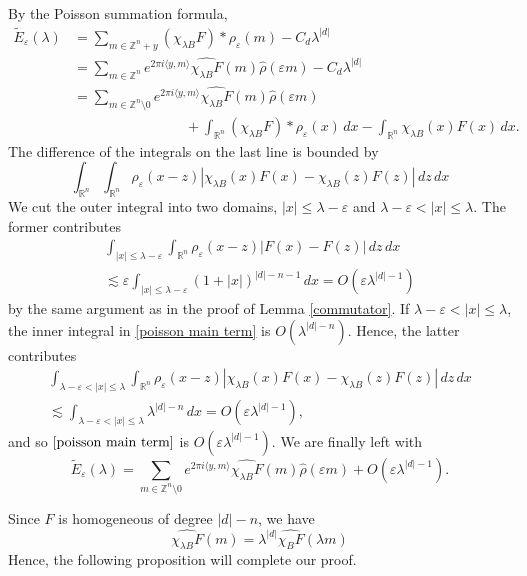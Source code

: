 \documentclass[10pt]{amsart}
\renewcommand{\epsilon}{\varepsilon}
\renewcommand{\epsilon}{\varepsilon}
\newcommand{\R}{{\mathbb R}}
\newcommand{\1}{\mathbb{1}}
\newcommand{\Z}{{\mathbb Z}}
\begin{document}
By the Poisson summation formula,
\begin{align*}
    \tilde E_\epsilon(\lambda) &= \sum_{m \in \Z^n + y} (\chi_{\lambda B} F)*\rho_\epsilon(m) - C_d \lambda^{|d|}\\
    &= \sum_{m \in \Z^n} e^{2\pi i\langle y,m \rangle} \widehat{\chi_{\lambda B} F}(m) \widehat \rho(\epsilon m) - C_d \lambda^{|d|}\\
    &= \sum_{m \in \Z^n \setminus 0} e^{2\pi i\langle y,m \rangle} \widehat{\chi_{\lambda B} F}(m) \widehat \rho(\epsilon m)\\
    &\hspace{8em} + \int_{\R^n} (\chi_{\lambda B} F)*\rho_\epsilon(x) \, dx - \int_{\R^n} \chi_{\lambda B}(x) F(x) \, dx.
\end{align*} 
The difference of the integrals on the last line is bounded by
\begin{equation}\label{poisson main term}
    \int_{\R^n} \int_{\R^n} \rho_\epsilon(x-z) |\chi_{\lambda B}(x) F(x) - \chi_{\lambda B}(z) F(z) | \, dz \, dx
\end{equation}
We cut the outer integral into two domains, $|x| \leq \lambda - \epsilon$ and $\lambda - \epsilon < |x| \leq \lambda$. The former contributes
\begin{multline*}
    \int_{|x| \leq \lambda - \epsilon} \int_{\R^n} \rho_\epsilon(x-z) |F(x) - F(z) | \, dz \, dx\\
    \lesssim \epsilon \int_{|x| \leq \lambda - \epsilon} (1 + |x|)^{|d|-n-1} \, dx = O(\epsilon \lambda^{|d|-1})
\end{multline*}
by the same argument as in the proof of Lemma \ref{commutator}. If $\lambda - \epsilon < |x| \leq \lambda$, the inner integral in \eqref{poisson main term} is $O(\lambda^{|d|-n})$. Hence, the latter contributes
\begin{multline*}
    \int_{\lambda - \epsilon < |x| \leq \lambda} \int_{\R^n} \rho_\epsilon(x-z) |\chi_{\lambda B}(x) F(x) - \chi_{\lambda B}(z) F(z) | \, dz \, dx\\
    \lesssim \int_{\lambda - \epsilon < |x| \leq \lambda} \lambda^{|d|-n} \, dx = O(\epsilon \lambda^{|d|-1}),
\end{multline*}
and so $\eqref{poisson main term}$ is $O(\epsilon \lambda^{|d|-1})$. We are finally left with
\[
    \tilde E_\epsilon(\lambda) = \sum_{m \in \Z^n \setminus 0} e^{2\pi i\langle y,m \rangle} \widehat{\chi_{\lambda B} F}(m) \widehat \rho(\epsilon m) + O(\epsilon \lambda^{|d|-1}).
\]

Since $F$ is homogeneous of degree $|d|-n$, we have
\[
    \widehat{\chi_{\lambda B} F}(m) = \lambda^{|d|} \widehat{\chi_B F}(\lambda m)
\]
Hence, the following proposition will complete our proof.
\end{document}
